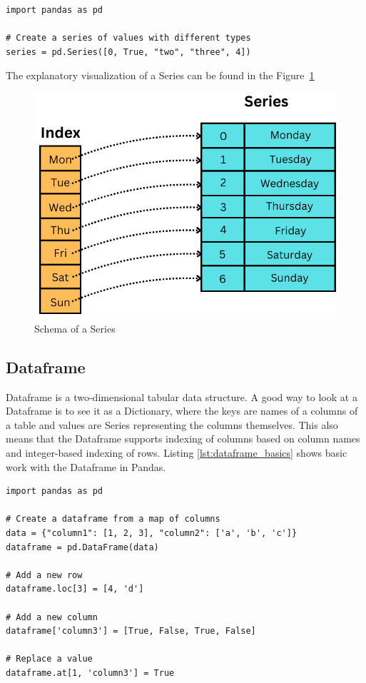 \begin{lstlisting}[caption=Heterogenous Series, label={lst:series_heterogeneous}, captionpos=b]
import pandas as pd

# Create a series of values with different types
series = pd.Series([0, True, "two", "three", 4])
\end{lstlisting}

The explanatory visualization of a Series can be found in the Figure~\ref{fig:series_schema}

\begin{figure}[H]
    \caption{Schema of a Series}
    \label{fig:series_schema}
    \centering
    \includegraphics[scale=0.4]{img/Series}
\end{figure}

\subsection{Dataframe} %

Dataframe is a two-dimensional tabular data structure.
A good way to look at a Dataframe is to see it as a Dictionary, where the keys are names of a columns of a table
and values are Series representing the columns themselves.
This also means that the Dataframe supports indexing of columns based on column names and integer-based indexing of rows.
Listing \ref{lst:dataframe_basics} shows basic work with the Dataframe in Pandas.

\begin{lstlisting}[caption=Working with Dataframe in Pandas, label={lst:dataframe_basics}, captionpos=b]
import pandas as pd

# Create a dataframe from a map of columns
data = {"column1": [1, 2, 3], "column2": ['a', 'b', 'c']}
dataframe = pd.DataFrame(data)

# Add a new row
dataframe.loc[3] = [4, 'd']

# Add a new column
dataframe['column3'] = [True, False, True, False]

# Replace a value
dataframe.at[1, 'column3'] = True
\end{lstlisting}

